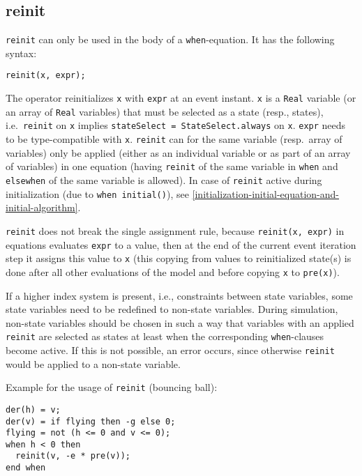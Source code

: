 \subsection{reinit}\label{reinit}

\lstinline!reinit! can only be used in the body of a \lstinline!when!-equation.
It has the following syntax:
\begin{lstlisting}[language=modelica]
reinit(x, expr);
\end{lstlisting}

The operator reinitializes \lstinline!x! with \lstinline!expr! at an event instant.
\lstinline!x! is a \lstinline!Real! variable (or an array of \lstinline!Real! variables) that must be selected as a state (resp., states), i.e.\ \lstinline!reinit! on \lstinline!x! implies \lstinline!stateSelect = StateSelect.always! on \lstinline!x!.
\lstinline!expr! needs to be type-compatible with \lstinline!x!.
\lstinline!reinit! can for the same variable (resp.\ array of variables) only be applied (either as an individual variable or as part of an array of variables) in one equation (having \lstinline!reinit! of the same variable in \lstinline!when! and \lstinline!elsewhen! of the same variable is allowed).
In case of \lstinline!reinit! active during initialization (due to \lstinline!when initial()!), see \cref{initialization-initial-equation-and-initial-algorithm}.

\lstinline!reinit! does not break the single assignment rule, because \lstinline!reinit(x, expr)! in equations evaluates \lstinline!expr! to a value,
then at the end of the current event iteration step it assigns this value to \lstinline!x! (this copying from values to reinitialized state(s) is done after all other evaluations of the model and before copying \lstinline!x! to \lstinline!pre(x)!).

\begin{example}
If a higher index system is present, i.e., constraints between state variables, some state variables need to be redefined to non-state variables.
During simulation, non-state variables should be chosen in such a way that variables with an applied \lstinline!reinit! are selected as states at least when the corresponding \lstinline!when!-clauses become active.
If this is not possible, an error occurs, since otherwise \lstinline!reinit! would be applied to a non-state variable.

Example for the usage of \lstinline!reinit! (bouncing ball):
\begin{lstlisting}[language=modelica]
der(h) = v;
der(v) = if flying then -g else 0;
flying = not (h <= 0 and v <= 0);
when h < 0 then
  reinit(v, -e * pre(v));
end when
\end{lstlisting}
\end{example}

